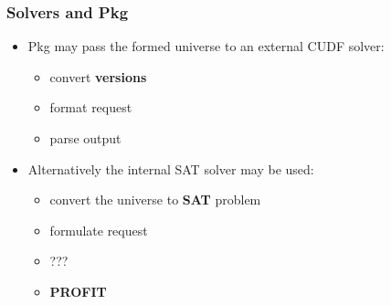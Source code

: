 \documentclass{beamer}
\begin{document}

\begin{frame}
\frametitle{Solvers and Pkg}
\begin{itemize}
  \item Pkg may pass the formed universe to an external CUDF solver:
  \begin{itemize}
    \item<2-> convert \textbf{versions}
    \item<2-> format request
    \item<2-> parse output
  \end{itemize}
  \item<3-> Alternatively the internal SAT solver may be used:
  \begin{itemize}
    \item<3-> convert the universe to \textbf{SAT} problem
    \item<3-> formulate request
    \item<3-> ???
    \item<3-> \textbf{PROFIT}
  \end{itemize} 
\end{itemize}
\end{frame}
\end{document}
